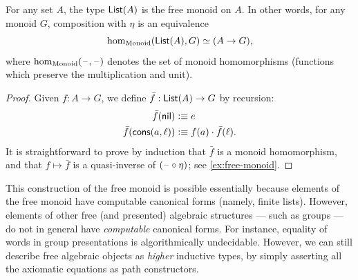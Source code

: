 \begin{lem}\label{thm:free-monoid}
  For any set $A$, the type $\mathsf{List}(A)$ is the free monoid on $A$.
  In other words, for any monoid $G$, composition with $\eta$ is an equivalence
  \[ \hom_{\mathrm{Monoid}}(\mathsf{List}(A),G) \simeq (A\to G), \]
  where $\hom_{\mathrm{Monoid}}(\mathord{\hspace{1pt}\text{--}\hspace{1pt}},\mathord{\hspace{1pt}\text{--}\hspace{1pt}})$ denotes the set of monoid homomorphisms (functions which preserve the multiplication and unit).
\end{lem}
\begin{proof}
  Given $f:A\to G$, we define $\bar{f}:\mathsf{List}(A) \to G$ by recursion:
  \begin{align*}
    \bar{f}(\mathsf{nil}) &\vcentcolon\equiv e\\
    \bar{f}(\mathsf{cons}(a,\ell)) &\vcentcolon\equiv f(a) \cdot \bar{f}(\ell).
  \end{align*}
  It is straightforward to prove by induction that $\bar{f}$ is a monoid homomorphism, and that $f\mapsto \bar f$ is a quasi-inverse of $(\mathord{\hspace{1pt}\text{--}\hspace{1pt}}\circ \eta)$; see \cref{ex:free-monoid}.
\end{proof}

%

This construction of the free monoid is possible essentially because elements of the free monoid have computable canonical forms (namely, finite lists).
However, elements of other free (and presented) algebraic structures --- such as groups --- do not in general have \emph{computable} canonical forms.
For instance, equality of words in group presentations is algorithmically undecidable.
However, we can still describe free algebraic objects as \emph{higher} inductive types, by simply asserting all the axiomatic equations as path constructors.

